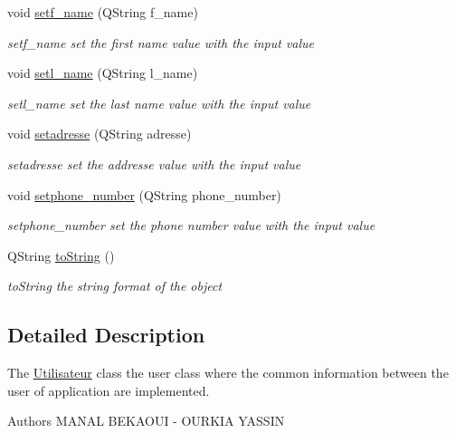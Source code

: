 \begin{DoxyCompactItemize}
void \mbox{\hyperlink{class_utilisateur_a79e3806e0aa6f5d263d03870621d3e59}{setf\+\_\+name}} (Q\+String f\+\_\+name)
\begin{DoxyCompactList}\small\item\em setf\+\_\+name set the first name value with the input value \end{DoxyCompactList}\item 
void \mbox{\hyperlink{class_utilisateur_ac3d130b027779c9aaaf55fab9a62ace6}{setl\+\_\+name}} (Q\+String l\+\_\+name)
\begin{DoxyCompactList}\small\item\em setl\+\_\+name set the last name value with the input value \end{DoxyCompactList}\item 
void \mbox{\hyperlink{class_utilisateur_a7047623a06539a397d1457d312985ba7}{setadresse}} (Q\+String adresse)
\begin{DoxyCompactList}\small\item\em setadresse set the addresse value with the input value \end{DoxyCompactList}\item 
void \mbox{\hyperlink{class_utilisateur_aec930972cb1ee96c8352a80d1cff78e7}{setphone\+\_\+number}} (Q\+String phone\+\_\+number)
\begin{DoxyCompactList}\small\item\em setphone\+\_\+number set the phone number value with the input value \end{DoxyCompactList}\item 
Q\+String \mbox{\hyperlink{class_utilisateur_a99523ad9c5e75e677240da2f3c6b63aa}{to\+String}} ()
\begin{DoxyCompactList}\small\item\em to\+String the string format of the object \end{DoxyCompactList}\end{DoxyCompactItemize}


\subsection{Detailed Description}
The \mbox{\hyperlink{class_utilisateur}{Utilisateur}} class the user class where the common information between the user of application are implemented. 

\begin{DoxyAuthor}{Authors}
M\+A\+N\+AL B\+E\+K\+A\+O\+UI -\/ O\+U\+R\+K\+IA Y\+A\+S\+S\+IN 
\end{DoxyAuthor}


